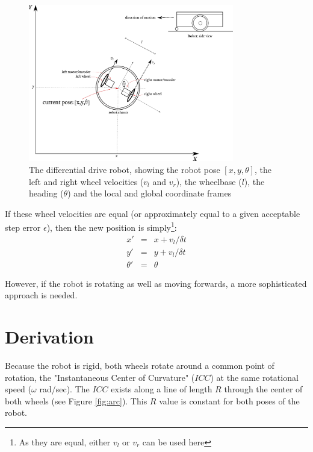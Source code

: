 \documentclass[11pt]{article}
\begin{document}
\begin{figure}
    \centering
    \includegraphics[width=0.8\textwidth]{images/robot.png}
    \caption{The differential drive robot, showing the robot pose $[x,y,\theta]$, the left and right wheel velocities 
             ($v_l$ and $v_r$), the wheelbase ($l$), the heading ($\theta$) and the local and global coordinate frames}
    \label{robot}
\end{figure}

If these wheel velocities are equal (or approximately equal to a given acceptable step error $\epsilon$), then the new position
is simply\footnote{As they are equal, either $v_l$ or $v_r$ can be used here}:
\begin{eqnarray}
    x' &=& x + v_l / \delta t \\
    y' &=& y + v_l / \delta t \\
    \theta' &=& \theta
\end{eqnarray}

However, if the robot is rotating as well as moving forwards, a more sophisticated approach is needed.

\section{Derivation}

Because the robot is rigid, both wheels rotate around a common point of rotation, the "Instantaneous Center of Curvature" 
($ICC$) at the same rotational speed ($\omega$ rad/sec). The $ICC$ exists along a line of length $R$ through the center
of both wheels (see Figure \ref{fig:arc}). This $R$ value is constant for both poses of the robot.
\end{document}
